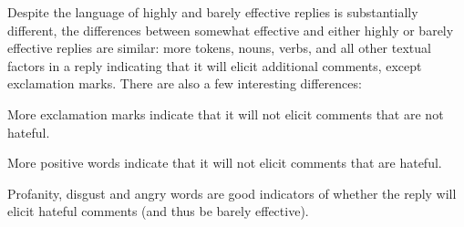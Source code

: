\documentclass[11pt]{article}
\begin{document}
Despite the language of highly and barely effective replies is substantially different,
the differences between somewhat effective and either highly or barely effective replies are similar:
more tokens, nouns, verbs, and all other textual factors in a reply indicating that it will elicit additional comments, except exclamation marks. 
There are also a few interesting differences:
\begin{compactitem}
	\item More exclamation marks indicate that it will not elicit comments that are not hateful.
	\item More positive words indicate that it will not elicit comments that are hateful.
	\item Profanity, disgust and angry words are good indicators of whether the reply will elicit hateful comments (and thus be barely effective).
\end{compactitem}

\begin{comment}
The second (Most vs. Neutral) and third (Least vs. Neutral) pairwise comparisons in Table \ref{t:linguistic-analysis} present the factors that differs between Neutral and the other two groups. 
Compared with Neutral, More has less profanity words and exclamation marks, while Least has more profanity and angry words. 
Surprisingly, though Most and Least differ in a lot of factors, they share similar characteristics when comparing to Neutral.  
We notice a few factors that attract more \emph{Futures} following the \emph{Reply}:
\begin{compactitem}
\item Having more tokens, nouns and verbs. \emph{Reply}s written in more words are more inclined to captivate comments. 
\item Using question marks. \emph{Reply}s using question marks are easier to have comments to follow.
\item Using 1st person pronouns express people's own opinions and 2nd person pronouns targeting others. 
\item Using overstated words indicating emphasis in certainty, such as absolute. 
\end{compactitem}
\end{comment}
\end{document}
